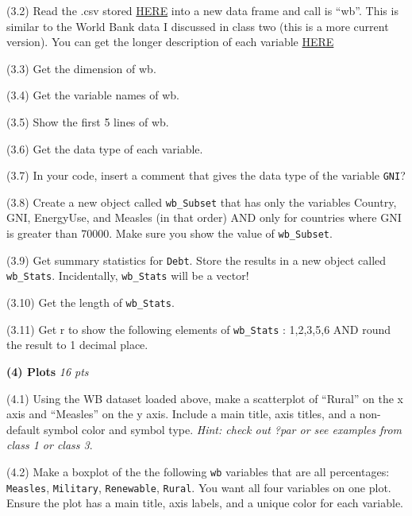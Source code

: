 \documentclass[
]{article}
\newenvironment{Shaded}{\begin{snugshade}}{\end{snugshade}}
\newcommand{\AttributeTok}[1]{\textcolor[rgb]{0.13,0.29,0.53}{#1}}
\newcommand{\FunctionTok}[1]{\textcolor[rgb]{0.13,0.29,0.53}{\textbf{#1}}}
\newcommand{\NormalTok}[1]{#1}
\newcommand{\SpecialCharTok}[1]{\textcolor[rgb]{0.81,0.36,0.00}{\textbf{#1}}}
\newcommand{\StringTok}[1]{\textcolor[rgb]{0.31,0.60,0.02}{#1}}
\begin{document}
(3.2) Read the .csv stored
\href{http://reuningscherer.net/S&DS230/data/WB_2024.csv}{HERE} into a
new data frame and call is ``wb''. This is similar to the World Bank
data I discussed in class two (this is a more current version). You can
get the longer description of each variable
\href{http://reuningscherer.net/S&DS230/data/WB_2024_NMS.csv}{HERE}

(3.3) Get the dimension of wb.

(3.4) Get the variable names of wb.

(3.5) Show the first 5 lines of wb.

(3.6) Get the data type of each variable.

(3.7) In your code, insert a comment that gives the data type of the
variable \texttt{GNI}?

(3.8) Create a new object called \texttt{wb\_Subset} that has only the
variables Country, GNI, EnergyUse, and Measles (in that order) AND only
for countries where GNI is greater than 70000. Make sure you show the
value of \texttt{wb\_Subset}.

(3.9) Get summary statistics for \texttt{Debt}. Store the results in a
new object called \texttt{wb\_Stats}. Incidentally, \texttt{wb\_Stats}
will be a vector!

(3.10) Get the length of \texttt{wb\_Stats}.

(3.11) Get r to show the following elements of \texttt{wb\_Stats} :
1,2,3,5,6 AND round the result to 1 decimal place.

\textbf{(4) Plots} \emph{16 pts}

(4.1) Using the WB dataset loaded above, make a scatterplot of ``Rural''
on the x axis and ``Measles'' on the y axis. Include a main title, axis
titles, and a non-default symbol color and symbol type. \emph{Hint:
check out ?par or see examples from class 1 or class 3}.

(4.2) Make a boxplot of the the following \texttt{wb} variables that are
all percentages: \texttt{Measles}, \texttt{Military},
\texttt{Renewable}, \texttt{Rural}. You want all four variables on one
plot. Ensure the plot has a main title, axis labels, and a unique color
for each variable.

\begin{Shaded}
\end{Shaded}
\end{document}
